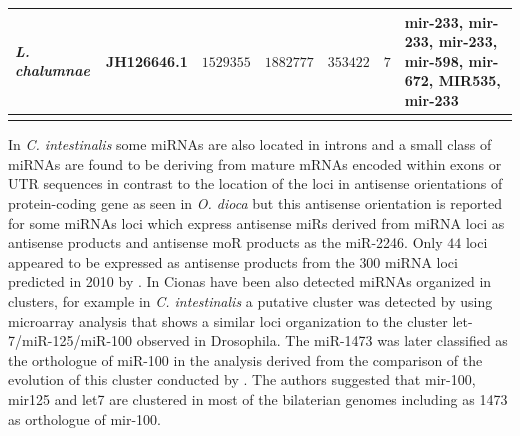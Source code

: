 \documentclass[graybox]{svmult}
\begin{document}
\begin{small}
\begin{center}
\begin{longtable}{p{2.0 cm}p{2 cm}p{2 cm}p{2 cm}p{1.2 cm}p{1.0 cm}p{2.6 cm}}
\textit{L. chalumnae} & JH126646.1 & $1529355$ & $1882777$ & $353422$ & $7$ & mir-233, mir-233, mir-233, mir-598, mir-672, MIR535, mir-233 \\
\hline\noalign{\smallskip}
\end{longtable}
\end{center}
\end{small}

In \textit{C. intestinalis} some miRNAs are also located in introns and a small 
class of miRNAs are found to be deriving from mature mRNAs encoded within exons 
or UTR sequences \cite{Hendrix2010} in contrast to the location of the  loci in 
antisense orientations of protein-coding gene as seen in \textit{O. dioca} but 
this antisense orientation is reported for some miRNAs loci which express 
antisense miRs derived from miRNA loci as antisense products and antisense moR 
products as the miR-2246. Only $44$ loci appeared to be expressed as antisense 
products from the $300$ miRNA loci predicted in 2010 by \cite{Hendrix2010}. In 
Cionas have been also detected miRNAs organized in clusters, for example in  
\textit{C. intestinalis} a putative cluster was detected by \cite{Keshavan2010} 
using microarray analysis that shows a similar loci organization to the cluster 
let-7/miR-125/miR-100 observed in Drosophila. The miR-1473 was later classified 
as the orthologue of miR-100 in the analysis derived from the comparison of the 
evolution of this cluster conducted by \cite{Griffiths-Jones2011}. The authors 
suggested that mir-100, mir125 and let7 are clustered in most of the bilaterian 
genomes including as 1473 as orthologue of mir-100. 

\end{document}
